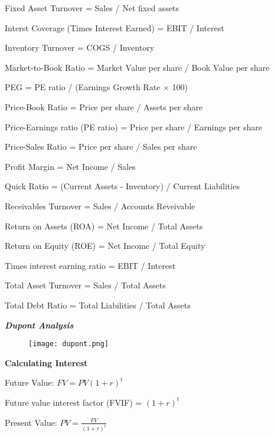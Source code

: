 \documentclass{article}
\newcommand{\bigtitle}[1]{
	\noindent
	\textbf{#1}
}
\newcommand{\smalltitle}[1]{
	\noindent
	\textbf{\textit{#1}}
}
\begin{document}
Fixed Asset Turnover = Sales / Net fixed assets

Interst Coverage (Times Interest Earned) = EBIT / Interest

Inventory Turnover = COGS / Inventory

Market-to-Book Ratio = Market Value per share / Book Value per share

PEG = PE ratio / (Earnings Growth Rate $\times$ 100)

Price-Book Ratio = Price per share / Assets per share

Price-Earnings ratio (PE ratio) = Price per share / Earnings per share

Price-Sales Ratio = Price per share / Sales per share

Profit Margin = Net Income / Sales

Quick Ratio = (Current Assets - Inventory) / Current Liabilities

Receivables Turnover = Sales / Accounts Reveivable

\vspace{-2.5 ex}
\begin{framed}
	\vspace{-1.5 ex}
	\noindent
	\hspace{0.5 em}Return on Assets (ROA) = Net Income / Total Assets
	
	\noindent
	\hspace{0.5 em}Return on Equity (ROE) = Net Income / Total Equity
	\vspace{-1.5 ex}
\end{framed}
\vspace{-2.5 ex}

Times interest earning ratio = EBIT / Interest

Total Asset Turnover = Sales / Total Assets

Total Debt Ratio = Total Liabilities / Total Assets


\smalltitle{Dupont Analysis}

\begin{figure}[htb]
	\centering
	\texttt{[image: dupont.png]}
	\label{fig:dupont}
	\vspace{-2em}
\end{figure}

\bigtitle{Calculating Interest}

Future Value: $FV = PV(1+r)^{t}$

Future value interest factor (FVIF) = $(1+r)^{t}$

Present Value: $PV = \frac{FV}{(1+r)^{t}}$
\end{document}
